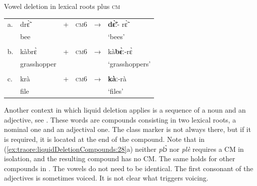 \documentclass[output=paper]{langscibook}
\begin{document}
    \begin{exe} 
        \ex Vowel deletion in lexical roots plus \textsc{cm} \label{ex:traore:liquidDeletionLexicalRootsCM:27}\\
        \begin{tabularx}{.8\textwidth}{l l l l l l}
            a. & drɛ̃̀        &   +   &   \textsc{cm}6    &   →   & \textbf{dɛ̃̀ː}{}-    rɛ̃̀ \\               
             &  bee           &       &                   &       &  `bees'\\
                            &       &                   & &      &       \\
          b. & kàbrɛ̀             &   +   &  \textsc{cm}6     &   →   & kà\textbf{bɛ̀ː}{}-rɛ̀\\
          & grasshopper       &       &                   &       & `grasshoppers'\\
                                      &       &           &        &       &       \\
            c. & krà             &  +    &   \textsc{cm}6    &   →   &   \textbf{kàː}{}-rà\\
        &     file            &       &                   &       &   `files'\\
        \end{tabularx}
    \end{exe}

Another context in which liquid deletion applies is a sequence of a noun and an adjective, see . These words are compounds consisting in two lexical roots, a nominal one and an adjectival one. The class marker is not always there, but if it is required, it is located at the end of the compound. Note that in (\ref{ex:traore:liquidDeletionCompounds:28}a) neither \textit{plɔ̀} nor \textit{plè} requires a CM in isolation, and the resulting compound has no CM. The same holds for other compounds in . The vowels do not need to be identical. The first consonant of the adjectives is sometimes voiced. It is not clear what triggers voicing.
\end{document}
